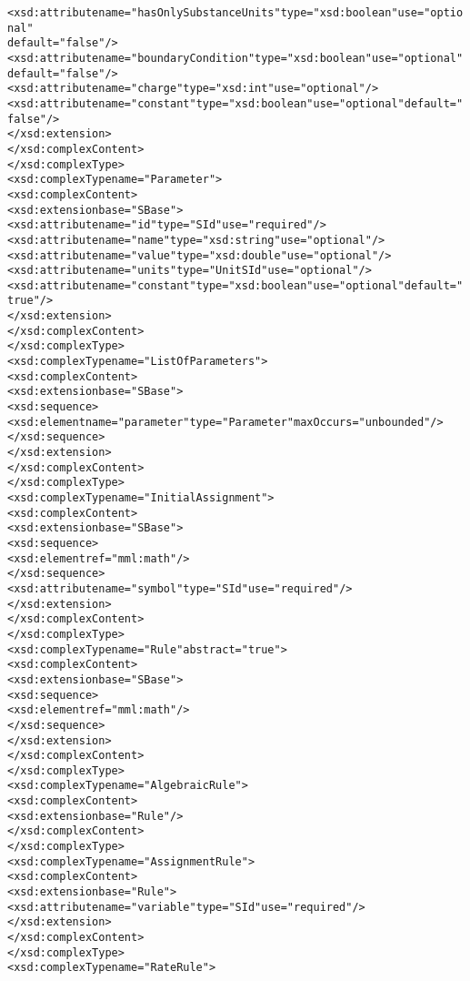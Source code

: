 \begin{alltt}
                <xsd:attribute name="hasOnlySubstanceUnits" type="xsd:boolean" use="optional"
                    default="false"/>
                <xsd:attribute name="boundaryCondition" type="xsd:boolean" use="optional"
                    default="false"/>
                <xsd:attribute name="charge" type="xsd:int" use="optional"/>
                <xsd:attribute name="constant" type="xsd:boolean" use="optional" default="false"/>
            </xsd:extension>
        </xsd:complexContent>
    </xsd:complexType>
    <xsd:complexType name="Parameter">
        <xsd:complexContent>
            <xsd:extension base="SBase">
                <xsd:attribute name="id" type="SId" use="required"/>
                <xsd:attribute name="name" type="xsd:string" use="optional"/>
                <xsd:attribute name="value" type="xsd:double" use="optional"/>
                <xsd:attribute name="units" type="UnitSId" use="optional"/>
                <xsd:attribute name="constant" type="xsd:boolean" use="optional" default="true"/>
            </xsd:extension>
        </xsd:complexContent>
    </xsd:complexType>
    <xsd:complexType name="ListOfParameters">
        <xsd:complexContent>
            <xsd:extension base="SBase">
                <xsd:sequence>
                    <xsd:element name="parameter" type="Parameter" maxOccurs="unbounded"/>
                </xsd:sequence>
            </xsd:extension>
        </xsd:complexContent>
    </xsd:complexType>
    <xsd:complexType name="InitialAssignment">
        <xsd:complexContent>
            <xsd:extension base="SBase">
                <xsd:sequence>
                    <xsd:element ref="mml:math"/>
                </xsd:sequence>
                <xsd:attribute name="symbol" type="SId" use="required"/>
            </xsd:extension>
        </xsd:complexContent>
    </xsd:complexType>
    <xsd:complexType name="Rule" abstract="true">
        <xsd:complexContent>
            <xsd:extension base="SBase">
                <xsd:sequence>
                    <xsd:element ref="mml:math"/>
                </xsd:sequence>
            </xsd:extension>
        </xsd:complexContent>
    </xsd:complexType>
    <xsd:complexType name="AlgebraicRule">
        <xsd:complexContent>
            <xsd:extension base="Rule"/>
        </xsd:complexContent>
    </xsd:complexType>
    <xsd:complexType name="AssignmentRule">
        <xsd:complexContent>
            <xsd:extension base="Rule">
                <xsd:attribute name="variable" type="SId" use="required"/>
            </xsd:extension>
        </xsd:complexContent>
    </xsd:complexType>
    <xsd:complexType name="RateRule">

\end{alltt}
